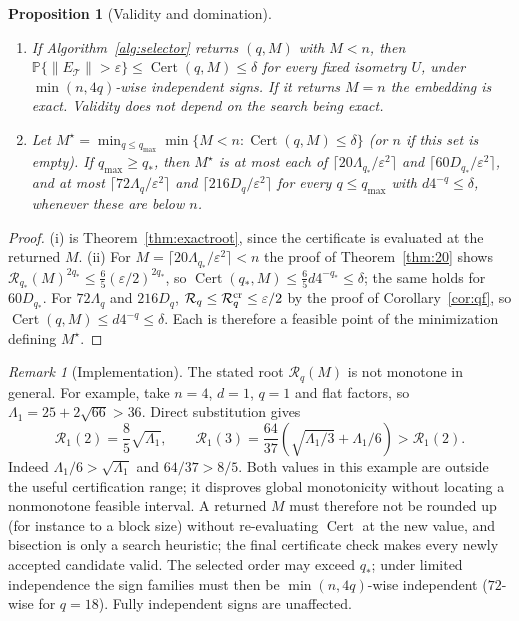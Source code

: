 \documentclass[11pt,a4paper]{article}
\newtheorem{proposition}[theorem]{Proposition}
\theoremstyle{definition}
\theoremstyle{remark}
\newtheorem{remark}[theorem]{Remark}
\numberwithin{equation}{section}
\newcommand{\Prob}{\mathbb P}
\newcommand{\eps}{\varepsilon}
\newcommand{\norm}[1]{\lVert#1\rVert}
\newcommand{\cT}{\mathcal T}
\newcommand{\Cert}{\operatorname{Cert}}
\newcommand{\Rex}{\mathcal R}
\begin{document}
\begin{proposition}[Validity and domination]\label{prop:selector}
\begin{enumerate}[label=(\roman*)]
\item If Algorithm~\ref{alg:selector} returns $(q,M)$ with $M<n$, then
$\Prob\{\norm{E_\cT}>\eps\}\le\Cert(q,M)\le\delta$ for every fixed isometry $U$,
under $\min(n,4q)$-wise independent signs. If it returns $M=n$ the embedding is
exact. Validity does not depend on the search being exact.
\item Let $M^\star=\min_{q\le q_{\max}}\min\{M<n:\Cert(q,M)\le\delta\}$ (or $n$
if this set is empty). If $q_{\max}\ge q_*$, then $M^\star$ is at most each of
$\lceil20\Lambda_{q_*}/\eps^2\rceil$ and $\lceil60D_{q_*}/\eps^2\rceil$, and at
most $\lceil72\Lambda_q/\eps^2\rceil$ and $\lceil216D_q/\eps^2\rceil$ for every
$q\le q_{\max}$ with $d4^{-q}\le\delta$, whenever these are below $n$.
\end{enumerate}
\end{proposition}
\begin{proof}
(i) is Theorem~\ref{thm:exactroot}, since the certificate is evaluated at the
returned $M$. (ii) For $M=\lceil20\Lambda_{q_*}/\eps^2\rceil<n$ the proof of
Theorem~\ref{thm:20} shows $\Rex_{q_*}(M)^{2q_*}\le\frac65(\eps/2)^{2q_*}$, so
$\Cert(q_*,M)\le\frac65d4^{-q_*}\le\delta$; the same holds for $60D_{q_*}$. For
$72\Lambda_q$ and $216D_q$, $\Rex_q\le\Rex_q^{\rm cr}\le\eps/2$ by the proof of
Corollary~\ref{cor:qf}, so $\Cert(q,M)\le d4^{-q}\le\delta$. Each is therefore a
feasible point of the minimization defining $M^\star$.
\end{proof}

\begin{remark}[Implementation]\label{rem:selector}
The stated root $\Rex_q(M)$ is not monotone in general. For example, take
$n=4$, $d=1$, $q=1$ and flat factors, so $\Lambda_1=25+2\sqrt{66}>36$.
Direct substitution gives
\[
 \Rex_1(2)=\frac85\sqrt{\Lambda_1},\qquad
 \Rex_1(3)=\frac{64}{37}\left(\sqrt{\Lambda_1/3}+\Lambda_1/6\right)
             >\Rex_1(2).
\]
Indeed $\Lambda_1/6>\sqrt{\Lambda_1}$ and $64/37>8/5$.
Both values in this example are outside the useful certification range;
it disproves global monotonicity without locating a nonmonotone feasible
interval. A returned $M$ must therefore not be rounded up (for
instance to a block size) without re-evaluating $\Cert$ at the new value, and
bisection is only a search heuristic; the final certificate check makes
every newly accepted candidate valid. The selected order may exceed $q_*$; under limited independence
the sign families must then be $\min(n,4q)$-wise independent ($72$-wise for
$q=18$). Fully independent signs are unaffected.
\end{remark}
\end{document}
